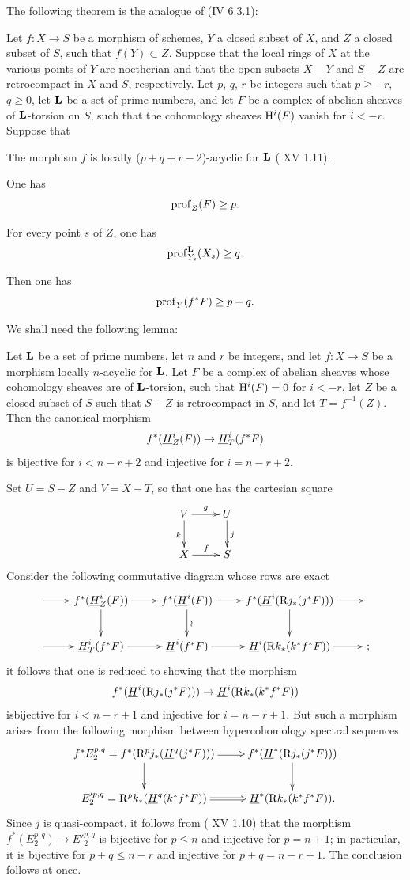 The following theorem is the analogue of (\EGA IV 6.3.1):

\begin{theoreme} \label{XIV.1.13}
Let $f:X\to S$ be a morphism of schemes, $Y$ a closed subset of $X$, and $Z$ a closed subset of $S$, such that $f(Y)\subset Z$. Suppose that the local rings of $X$ at the various points of $Y$ are noetherian and that the open subsets $X-Y$ and $S-Z$ are retrocompact in $X$ and $S$, respectively. Let $p$, $q$, $r$ be integers such that $p\geq -r$, $q\geq 0$, let $\mathbf L$ be a set of prime numbers, and let $F$ be a complex of abelian sheaves of $\mathbf L$-torsion on $S$, such that the cohomology sheaves $\mathrm H^i(F)$ vanish for $i<-r$. Suppose that
\begin{enumeratea}
\item
The morphism $f$ is locally ($p+q+r-2$)-acyclic for $\mathbf L$ \textup{( XV 1.11)}.
\item
One has
$$
\operatorname{prof}_Z(F)\geq p.
$$
\item
For every point $s$ of $Z$, one has
$$
\operatorname{prof}_{Y_s}^{\mathbf L}(X_s)\geq q.
$$
\end{enumeratea}
\noindent
Then one has\pageoriginale
$$
\operatorname{prof}_Y(f^*F)\geq p+q.
$$
\end{theoreme}

We shall need the following lemma:

\begin{sublemme} \label{XIV.1.13.1}
Let $\mathbf L$ be a set of prime numbers, let $n$ and $r$ be integers, and let $f:X\to S$ be a morphism locally $n$-acyclic for $\mathbf L$. Let $F$ be a complex of abelian sheaves whose cohomology sheaves are of $\mathbf L$-torsion, such that $\mathrm H^i(F)=0$ for $i<-r$, let $Z$ be a closed subset of $S$ such that $S-Z$ is retrocompact in $S$, and let $T=f^{-1}(Z)$. Then the canonical morphism
$$f^*({\mathop{\underline{H}}\nolimits}_Z^i(F))\to {\mathop{\underline{H}}\nolimits}_T^i(f^*F)$$
is bijective for $i<n-r+2$ and injective for $i=n-r+2$.
\end{sublemme}

Set $U=S-Z$ and $V=X-T$, so that one has the cartesian square
$$
\xymatrix{
V \ar[r]^-g\ar[d]_k& U\ar[d]^j\\
X \ar[r]^-f&S
}$$
Consider the following commutative diagram whose rows are exact
$$
\xymatrix{ \ar[r]&f^*({\h}_Z^i(F))\ar[r]\ar[d]& f^*({\h}^i(F))\ar[r]\ar[d]^{\wr} &f^*({\h}^i(\R j_*(j^*F)))\ar[r]\ar[d]& \\
\ar[r] &{\h}_T^i(f^*F)\ar[r]& {\h}^i(f^*F) \ar[r]&{\h}^i(\R k_*(k^*f^*F)) \ar[r]&\text{;}}$$
it follows that one is reduced to showing that the morphism
$$f^*({\mathop{\underline{H}}\nolimits}^i(\mathrm R j_*(j^*F)))\to {\mathop{\underline{H}}\nolimits}^i(\mathrm R k_*(k^*f^*F))$$
is\pageoriginale bijective for $i<n-r+1$ and injective for $i=n-r+1$. But such a morphism arises from the following morphism between hypercohomology spectral sequences
$$
\xymatrix{f^*E_2^{p, q}=f^*(\R^pj_*({\h}^q(j^*F)))\ar@{=>} [r]\ar[d]&f^*({\h}^*(\R j_*(j^*F)))\ar[d]\\
E'^{p, q}_2=\R^pk_*({\h}^q(k^*f^*F))\ar@{=>}[r]&{\h}^*(\R k_*(k^*f^*F)).}
$$
Since $j$ is quasi-compact, it follows from ( XV 1.10) that the morphism $f^*(E^{p, q}_2)\to E'^{p, q}_2$ is bijective for $p\leq n$ and injective for $p=n+1$; in particular, it is bijective for $p+q\leq n-r$ and injective for $p+q=n-r+1$. The conclusion follows at once.

